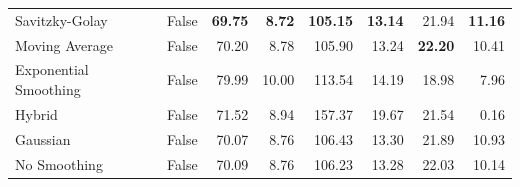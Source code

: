 \documentclass[12pt,oneside]{book} %
\begin{document}
\begin{table}[H]
\begin{adjustbox}{max width=\textwidth}
\begin{tabular}{llrrrrrr}
            Savitzky-Golay         & False        & \textbf{69.75}    & \textbf{8.72}     & \textbf{105.15}   & \textbf{13.14}    & 21.94              & \textbf{11.16}     \\
            Moving Average         & False        & 70.20             & 8.78              & 105.90            & 13.24             & \textbf{22.20 }    & 10.41              \\
            Exponential Smoothing  & False        & 79.99             & 10.00             & 113.54            & 14.19             & 18.98              & 7.96               \\
            Hybrid                 & False        & 71.52             & 8.94              & 157.37            & 19.67             & 21.54              & 0.16               \\
            Gaussian               & False        & 70.07             & 8.76              & 106.43            & 13.30             & 21.89              & 10.93              \\
            No Smoothing           & False        & 70.09             & 8.76              & 106.23            & 13.28             & 22.03              & 10.14              \\
            \bottomrule
        \end{tabular}
    \end{adjustbox}
    \label{tab:performance_metrics_video_lab_semiopen_1_3}
\end{table}
\end{document}
